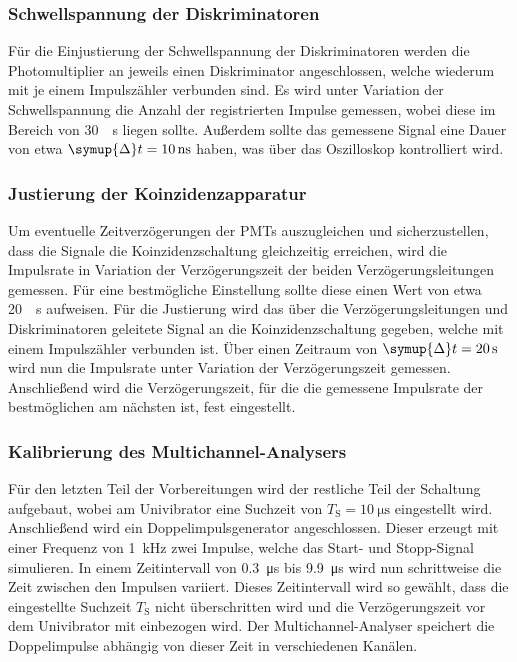 \subsubsection{Schwellspannung der Diskriminatoren}

Für die Einjustierung der Schwellspannung der Diskriminatoren werden die Photomultiplier an jeweils einen Diskriminator angeschlossen,
welche wiederum mit je einem Impulszähler verbunden sind.
Es wird unter Variation der Schwellspannung die Anzahl der registrierten Impulse gemessen,
wobei diese im Bereich von \SI[per-mode=reciprocal]{30}{\per\second} liegen sollte.
Außerdem sollte das gemessene Signal eine Dauer von etwa $\symup{\Delta}t = \SI{10}{\nano\second}$ haben,
was über das Oszilloskop kontrolliert wird.


\subsubsection{Justierung der Koinzidenzapparatur}

Um eventuelle Zeitverzögerungen der \acp{PMT} auszugleichen und sicherzustellen,
dass die Signale die Koinzidenzschaltung gleichzeitig erreichen,
wird die Impulsrate in Variation der Verzögerungszeit der beiden Verzögerungsleitungen gemessen.
Für eine bestmögliche Einstellung sollte diese einen Wert von etwa \SI[per-mode=reciprocal]{20}{\per\second} aufweisen.
Für die Justierung wird das über die Verzögerungsleitungen und Diskriminatoren geleitete Signal an die Koinzidenzschaltung gegeben,
welche mit einem Impulszähler verbunden ist.
Über einen Zeitraum von $\symup{\Delta}t = \SI{20}{\second}$ wird nun die Impulsrate unter Variation der Verzögerungszeit gemessen.
Anschließend wird die Verzögerungszeit,
für die die gemessene Impulsrate der bestmöglichen am nächsten ist,
fest eingestellt.


\subsubsection{Kalibrierung des Multichannel-Analysers}

Für den letzten Teil der Vorbereitungen wird der restliche Teil der Schaltung aufgebaut,
wobei am Univibrator eine Suchzeit von $T_\text{S} = \SI{10}{\micro\second}$ eingestellt wird.
Anschließend wird ein Doppelimpulsgenerator angeschlossen.
Dieser erzeugt mit einer Frequenz von \SI{1}{\kilo\hertz} zwei Impulse,
welche das Start- und Stopp-Signal simulieren.
In einem Zeitintervall von \SI{0.3}{\micro\second} bis \SI{9.9}{\micro\second} wird nun schrittweise die Zeit zwischen den Impulsen variiert.
Dieses Zeitintervall wird so gewählt,
dass die eingestellte Suchzeit $T_\text{S}$ nicht überschritten wird und die Verzögerungszeit vor dem Univibrator mit einbezogen wird.
Der Multichannel-Analyser speichert die Doppelimpulse abhängig von dieser Zeit in verschiedenen Kanälen.

